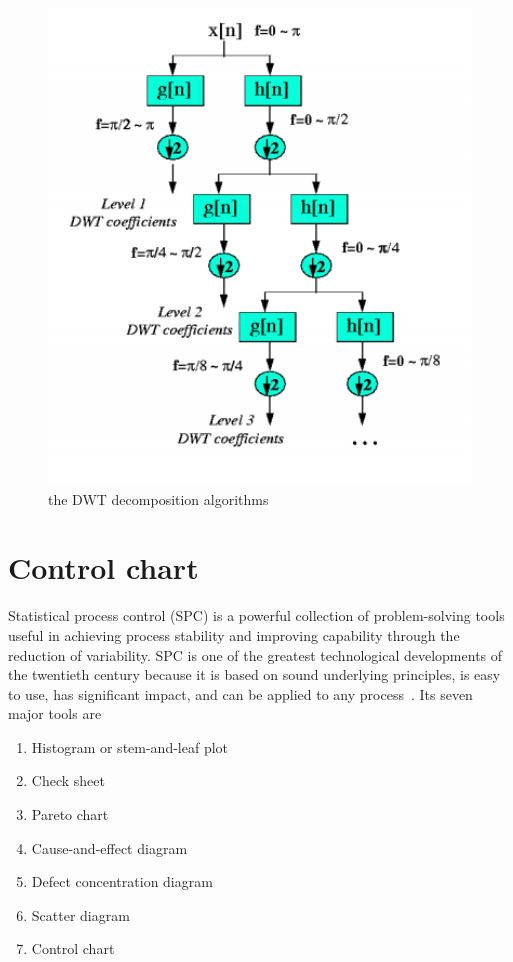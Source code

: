 \begin{figure}[h]
\centering
\includegraphics[width=1\textwidth]{images/dwt1.PNG}
\caption{the DWT decomposition algorithms}
\label{fig:dwt1}
\end{figure}














\section{Control chart}



Statistical process control (SPC) is a powerful collection of problem-solving
tools useful in achieving process stability and improving capability through the reduction of variability.
SPC is one of the greatest technological developments of the twentieth century because it is based on sound underlying principles, is easy to use, has significant impact, and can be applied to any process~\cite{montgomery2020introduction}. Its seven major tools are
\begin{enumerate}
    \item Histogram or stem-and-leaf plot
    \item Check sheet
    \item Pareto chart
    \item Cause-and-effect diagram
    \item Defect concentration diagram
    \item Scatter diagram
    \item Control chart
\end{enumerate}

